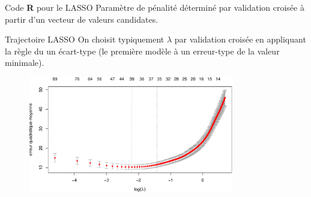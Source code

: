 \documentclass[
  ignorenonframetext,
]{beamer}
\newenvironment{Shaded}{\begin{snugshade}}{\end{snugshade}}
\newcommand{\AttributeTok}[1]{\textcolor[rgb]{0.40,0.45,0.13}{#1}}
\newcommand{\DecValTok}[1]{\textcolor[rgb]{0.68,0.00,0.00}{#1}}
\newcommand{\FloatTok}[1]{\textcolor[rgb]{0.68,0.00,0.00}{#1}}
\newcommand{\FunctionTok}[1]{\textcolor[rgb]{0.28,0.35,0.67}{#1}}
\newcommand{\NormalTok}[1]{\textcolor[rgb]{0.00,0.23,0.31}{#1}}
\newcommand{\OtherTok}[1]{\textcolor[rgb]{0.00,0.23,0.31}{#1}}
\newcommand{\SpecialCharTok}[1]{\textcolor[rgb]{0.37,0.37,0.37}{#1}}
\begin{document}
\begin{frame}[fragile]{Code \textbf{R} pour le LASSO}
\protect\hypertarget{code-r-pour-le-lasso}{}
Paramètre de pénalité déterminé par validation croisée à partir d'un
vecteur de valeurs candidates.

\begin{Shaded}
\end{Shaded}
\end{frame}

\begin{frame}{Trajectoire LASSO}
\protect\hypertarget{trajectoire-lasso}{}
On choisit typiquement \(\lambda\) par validation croisée en appliquant
la règle du un écart-type (le première modèle à un erreur-type de la
valeur minimale).

\begin{figure}

{\centering \includegraphics[width=0.8\textwidth,height=\textheight]{figures/fig-lassopath.pdf}

}

\end{figure}
\end{frame}
\end{document}
